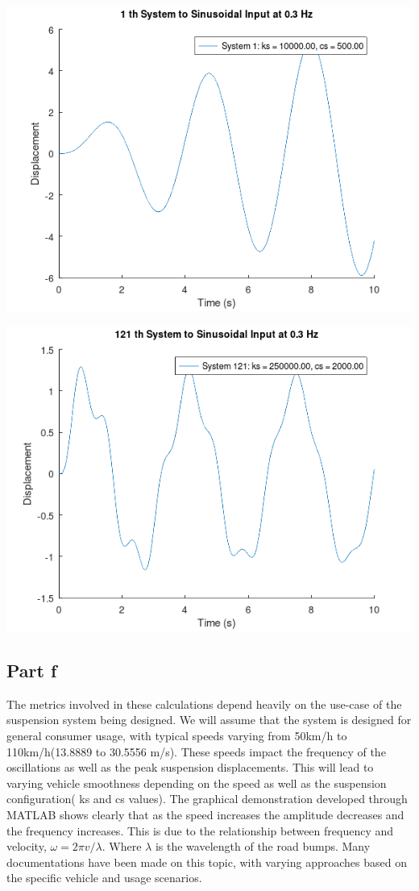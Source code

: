 \documentclass[11pt]{article}
\begin{document}
\begin{center}
\includegraphics[width=.9\linewidth]{ENG204-Assignment-2-Sinusoidal-f-0.3-1.png}
\end{center}
\begin{center}
\includegraphics[width=.9\linewidth]{ENG204-Assignment-2-Sinusoidal-f-0.3-121.png}
\end{center}
\subsection{Part f}
\label{sec:org5621049}
The metrics involved in these calculations depend heavily on the use-case of the suspension system being designed. We will assume that the system is designed for general consumer usage, with typical speeds varying from 50km/h to 110km/h(13.8889 to 30.5556 m/s). These speeds impact the frequency of the oscillations as well as the peak suspension displacements. This will lead to varying vehicle smoothness depending on the speed as well as the suspension configuration( ks and cs values). The graphical demonstration developed through MATLAB shows clearly that as the speed increases the amplitude decreases and the frequency increases. This is due to the relationship between frequency and velocity, \(\omega =2\pi v/\lambda\). Where \(\lambda\) is the wavelength of the road bumps. Many documentations have been made on this topic, with varying approaches based on the specific vehicle and usage scenarios.
\end{document}

